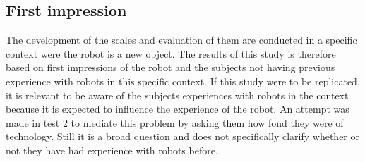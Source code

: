 \subsection{First impression}

The development of the scales and evaluation of them are conducted in a specific context were the robot is a new object. The results of this study is therefore based on first impressions of the robot and the subjects not having previous experience with robots in this specific context. If this study were to be replicated, it is relevant to be aware of the subjects experiences with robots in the context because it is expected to influence the experience of the robot. 
An attempt was made in test 2 to mediate this problem by asking them how fond they were of technology. Still it is a broad question and does not specifically clarify whether or not they have had experience with robots before.
